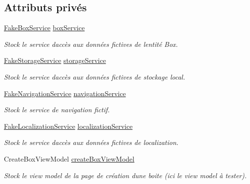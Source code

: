 \subsection*{Attributs privés}
\begin{DoxyCompactItemize}
\item 
\hyperlink{class_boxes_1_1_tests_1_1_mock_1_1_services_1_1_fake_box_service}{Fake\+Box\+Service} \hyperlink{class_boxes_1_1_tests_1_1_create_box_view_model_tests_a3574fac430ae1fafdc6462748df828f8}{box\+Service}
\begin{DoxyCompactList}\small\item\em Stock le service d\textquotesingle{}accès aux données fictives de l\textquotesingle{}entité Box. \end{DoxyCompactList}\item 
\hyperlink{class_boxes_1_1_tests_1_1_mock_1_1_services_1_1_fake_storage_service}{Fake\+Storage\+Service} \hyperlink{class_boxes_1_1_tests_1_1_create_box_view_model_tests_a0f47944eb8fc4ec9d3fa19aef2e597a4}{storage\+Service}
\begin{DoxyCompactList}\small\item\em Stock le service d\textquotesingle{}accès aux données fictives de stockage local. \end{DoxyCompactList}\item 
\hyperlink{class_boxes_1_1_tests_1_1_mock_1_1_services_1_1_fake_navigation_service}{Fake\+Navigation\+Service} \hyperlink{class_boxes_1_1_tests_1_1_create_box_view_model_tests_a4b133a0a51f3a1fccdbfe2c4e110c526}{navigation\+Service}
\begin{DoxyCompactList}\small\item\em Stock le service de navigation fictif. \end{DoxyCompactList}\item 
\hyperlink{class_boxes_1_1_tests_1_1_mock_1_1_services_1_1_fake_localization_service}{Fake\+Localization\+Service} \hyperlink{class_boxes_1_1_tests_1_1_create_box_view_model_tests_aaefad9e2f283139c6df197b6a9b6488d}{localization\+Service}
\begin{DoxyCompactList}\small\item\em Stock le service d\textquotesingle{}accès aux données fictives de localization. \end{DoxyCompactList}\item 
Create\+Box\+View\+Model \hyperlink{class_boxes_1_1_tests_1_1_create_box_view_model_tests_aca1f0f5d93687b6dec26894d54ff2b2d}{create\+Box\+View\+Model}
\begin{DoxyCompactList}\small\item\em Stock le view model de la page de création d\textquotesingle{}une boite (ici le view model à tester). \end{DoxyCompactList}\end{DoxyCompactItemize}


